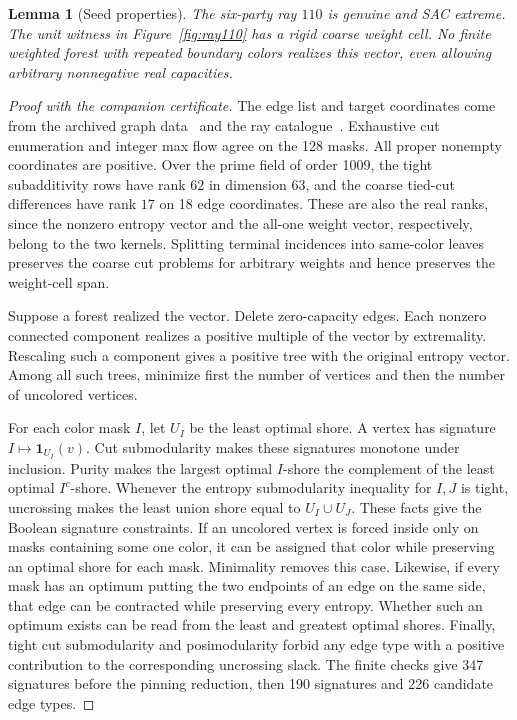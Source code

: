 \documentclass[11pt]{article}
\newtheorem{lemma}[theorem]{Lemma}
\begin{document}
\begin{lemma}[Seed properties]
\label{lem:seed}
The six-party ray \(110\) is genuine and SAC extreme. The unit witness
in Figure~\ref{fig:ray110} has a rigid coarse weight cell. No finite
weighted forest with repeated boundary colors realizes this vector,
even allowing arbitrary nonnegative real capacities.
\end{lemma}

\begin{proof}[Proof with the companion certificate]
The edge list and target coordinates come from the archived graph
data~\cite{fletcher} and the ray catalogue~\cite{hhr2025}. Exhaustive
cut enumeration and integer max flow agree on the 128 masks.
All proper nonempty coordinates are positive. Over the prime field
of order 1009, the tight subadditivity rows have rank \(62\) in
dimension \(63\), and the coarse tied-cut differences have rank \(17\)
on 18 edge coordinates. These are also the real ranks, since the
nonzero entropy vector and the all-one weight vector, respectively,
belong to the two kernels. Splitting terminal incidences into
same-color leaves preserves the coarse cut problems for arbitrary
weights and hence preserves the weight-cell span.

Suppose a forest realized the vector. Delete zero-capacity edges.
Each nonzero connected component realizes a positive multiple of
the vector by extremality. Rescaling such a component gives a
positive tree with the original entropy vector. Among all such trees,
minimize first the number of vertices and then the number of
uncolored vertices.

For each color mask \(I\), let \(U_I\) be the least optimal shore.
A vertex has signature \(I\mapsto \mathbf 1_{U_I}(v)\). Cut
submodularity makes these signatures monotone under inclusion.
Purity makes the largest optimal \(I\)-shore the complement of the
least optimal \(I^c\)-shore. Whenever the entropy submodularity
inequality for \(I,J\) is tight, uncrossing makes the least union
shore equal to \(U_I\cup U_J\). These facts give the Boolean signature
constraints. If an uncolored vertex is forced inside only on masks
containing some one color, it can be assigned that color while
preserving an optimal shore for each mask. Minimality removes this
case. Likewise, if every mask has an optimum putting the two
endpoints of an edge on the same side, that edge can be contracted
while preserving every entropy. Whether such an optimum exists can
be read from the least and greatest optimal shores. Finally, tight cut
submodularity and posimodularity forbid any edge type with a positive
contribution to the corresponding uncrossing slack. The finite
checks give 347 signatures before the pinning reduction, then
190 signatures and 226 candidate edge types.


\end{proof}
\end{document}
